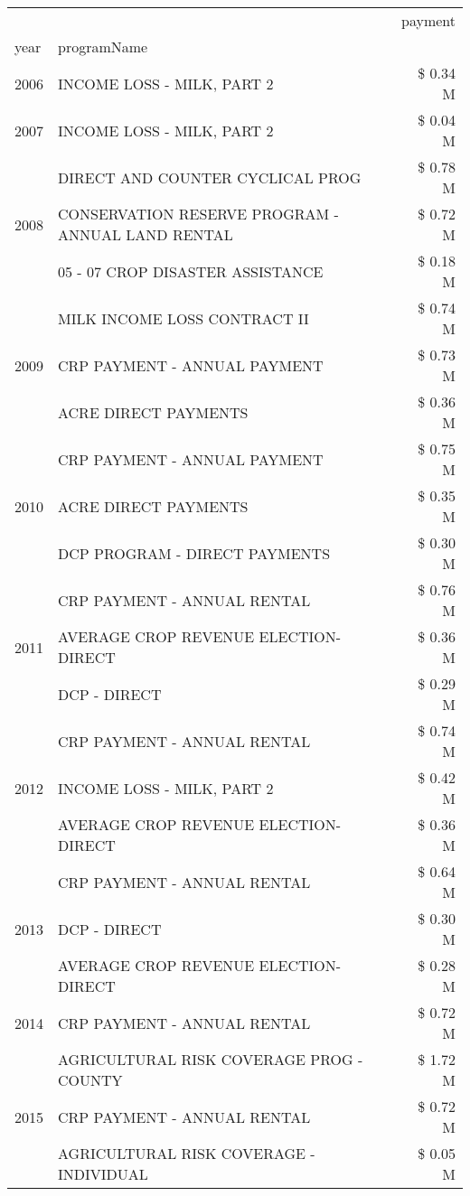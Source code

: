 \begin{tabular}{llr}
\toprule
 &  & payment \\
year & programName &  \\
\midrule
2006 & INCOME LOSS - MILK, PART 2 & \$ 0.34 M \\
\cline{1-3}
2007 & INCOME LOSS - MILK, PART 2 & \$ 0.04 M \\
\cline{1-3}
\multirow[t]{3}{*}{2008} & DIRECT AND COUNTER CYCLICAL PROG & \$ 0.78 M \\
 & CONSERVATION RESERVE PROGRAM - ANNUAL LAND RENTAL & \$ 0.72 M \\
 & 05 - 07 CROP DISASTER ASSISTANCE & \$ 0.18 M \\
\cline{1-3}
\multirow[t]{3}{*}{2009} & MILK INCOME LOSS CONTRACT II & \$ 0.74 M \\
 & CRP PAYMENT - ANNUAL PAYMENT & \$ 0.73 M \\
 & ACRE DIRECT PAYMENTS & \$ 0.36 M \\
\cline{1-3}
\multirow[t]{3}{*}{2010} & CRP PAYMENT - ANNUAL PAYMENT & \$ 0.75 M \\
 & ACRE DIRECT PAYMENTS & \$ 0.35 M \\
 & DCP PROGRAM - DIRECT PAYMENTS & \$ 0.30 M \\
\cline{1-3}
\multirow[t]{3}{*}{2011} & CRP PAYMENT - ANNUAL RENTAL & \$ 0.76 M \\
 & AVERAGE CROP REVENUE ELECTION-DIRECT & \$ 0.36 M \\
 & DCP - DIRECT & \$ 0.29 M \\
\cline{1-3}
\multirow[t]{3}{*}{2012} & CRP PAYMENT - ANNUAL RENTAL & \$ 0.74 M \\
 & INCOME LOSS - MILK, PART 2 & \$ 0.42 M \\
 & AVERAGE CROP REVENUE ELECTION-DIRECT & \$ 0.36 M \\
\cline{1-3}
\multirow[t]{3}{*}{2013} & CRP PAYMENT - ANNUAL RENTAL & \$ 0.64 M \\
 & DCP - DIRECT & \$ 0.30 M \\
 & AVERAGE CROP REVENUE ELECTION-DIRECT & \$ 0.28 M \\
\cline{1-3}
2014 & CRP PAYMENT - ANNUAL RENTAL & \$ 0.72 M \\
\cline{1-3}
\multirow[t]{3}{*}{2015} & AGRICULTURAL RISK COVERAGE PROG - COUNTY & \$ 1.72 M \\
 & CRP PAYMENT - ANNUAL RENTAL & \$ 0.72 M \\
 & AGRICULTURAL RISK COVERAGE - INDIVIDUAL & \$ 0.05 M \\
\cline{1-3}

\end{tabular}

